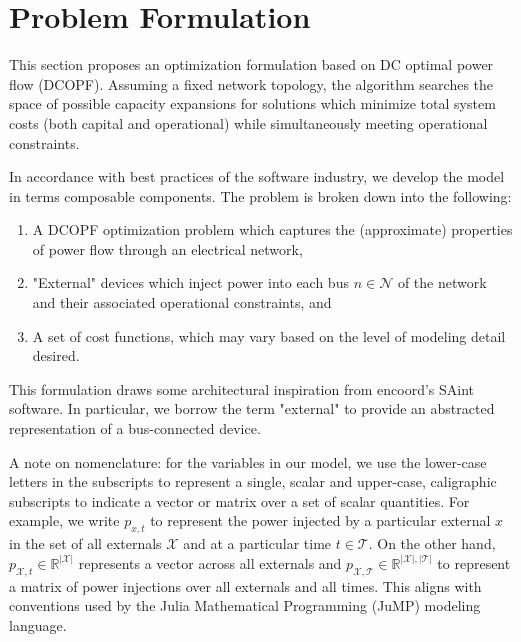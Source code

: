 \documentclass[journal,11pt]{IEEEtran}
\newcommand{\R}{\mathbb{R}}
\newcommand{\X}{\mathcal{X}}
\newcommand{\T}{\mathcal{T}}
\newcommand{\N}{\mathcal{N}}
\newcommand{\sizeX}{\left\vert \X \right\vert}
\newcommand{\sizeT}{\left\vert \T \right\vert}
\begin{document}
\section{Problem Formulation}
\label{sec:problem}

This section proposes an optimization formulation based on DC optimal power flow (DCOPF). Assuming a fixed network topology,
the algorithm searches the space of possible capacity expansions for solutions which minimize total system costs (both capital
and operational) while simultaneously meeting operational constraints.

In accordance with best practices of the software industry, we develop the model in terms composable components. The problem
is broken down into the following:
\begin{enumerate}
  \item A DCOPF optimization problem which captures the (approximate) properties of power flow through an electrical network,
  \item "External" devices which inject power into each bus $n\in\N$ of the network and their associated operational constraints, and
  \item A set of cost functions, which may vary based on the level of modeling detail desired.
\end{enumerate}

This formulation draws some architectural inspiration from encoord's SAint software. In particular, we borrow the term "external"
to provide an abstracted representation of a bus-connected device.

A note on nomenclature: for the variables in our model,
we use the lower-case letters in the subscripts to represent a single, scalar
and upper-case, caligraphic subscripts to indicate a vector or matrix over a set of scalar quantities. For example, we write
$p_{x, t}$ to represent the power injected by a particular external $x$ in the set of all externals $\X$ and at a particular time $t\in\T$.
On the other hand, $p_{\X, t} \in \R^{\sizeX}$ represents a vector across all externals and $p_{\X, \T} \in \R^{\sizeX, \sizeT}$
to represent a matrix of power injections over all externals and all times. This aligns with conventions used by the Julia Mathematical
Programming (JuMP) modeling language.
\end{document}
